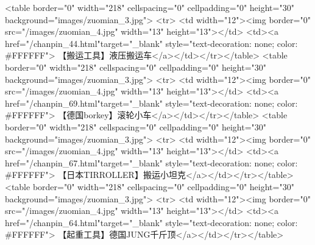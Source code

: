                                                             <table border="0" width="218" cellspacing="0" cellpadding="0" height="30" background="images/zuomian_3.jpg">
                                                                <tr>
                                                                    <td width="12"><img border="0" src="/images/zuomian_4.jpg" width="13" height="13"></td>
                                                                    <td><a href="/chanpin_44.html"target="_blank" style="text-decoration: none; color: #FFFFFF">
                                                                            【搬运工具】液压搬运车</a></td></tr></table>
                                                            <table border="0" width="218" cellspacing="0" cellpadding="0" height="30" background="images/zuomian_3.jpg">
                                                                <tr>
                                                                    <td width="12"><img border="0" src="/images/zuomian_4.jpg" width="13" height="13"></td>
                                                                    <td><a href="/chanpin_69.html"target="_blank" style="text-decoration: none; color: #FFFFFF">
                                                                            【德国borkey】滚轮小车</a></td></tr></table>
                                                            <table border="0" width="218" cellspacing="0" cellpadding="0" height="30" background="images/zuomian_3.jpg">
                                                                <tr>
                                                                    <td width="12"><img border="0" src="/images/zuomian_4.jpg" width="13" height="13"></td>
                                                                    <td><a href="/chanpin_67.html"target="_blank" style="text-decoration: none; color: #FFFFFF">
                                                                            【日本TIRROLLER】搬运小坦克</a></td></tr></table>
                                                            <table border="0" width="218" cellspacing="0" cellpadding="0" height="30" background="images/zuomian_3.jpg">
                                                                <tr>
                                                                    <td width="12"><img border="0" src="/images/zuomian_4.jpg" width="13" height="13"></td>
                                                                    <td><a href="/chanpin_64.html"target="_blank" style="text-decoration: none; color: #FFFFFF">
                                                                            【起重工具】德国JUNG千斤顶</a></td></tr></table>
